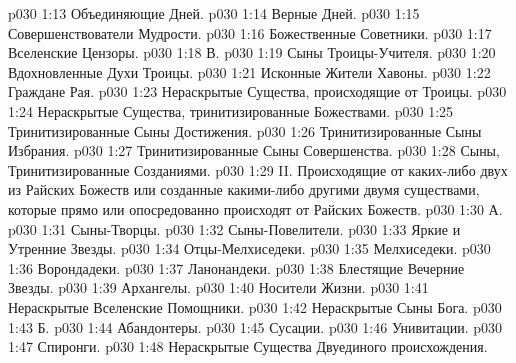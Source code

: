 \vs p030 1:13 \bibnobreakspace Объединяющие Дней.
\vs p030 1:14 \bibnobreakspace Верные Дней.
\vs p030 1:15 \bibnobreakspace Совершенствователи Мудрости.
\vs p030 1:16 \bibnobreakspace Божественные Советники.
\vs p030 1:17 \bibnobreakspace Вселенские Цензоры.
\vs p030 1:18 \pc В. 
\vs p030 1:19 \pc {}\bibnobreakspace Сыны Троицы\hyp{}Учителя.
\vs p030 1:20 \bibnobreakspace Вдохновленные Духи Троицы.
\vs p030 1:21 \bibnobreakspace Исконные Жители Хавоны.
\vs p030 1:22 \bibnobreakspace Граждане Рая.
\vs p030 1:23 \bibnobreakspace Нераскрытые Существа, происходящие от Троицы.
\vs p030 1:24 \bibnobreakspace Нераскрытые Существа, тринитизированные Божествами.
\vs p030 1:25 \bibnobreakspace Тринитизированные Сыны Достижения.
\vs p030 1:26 \bibnobreakspace Тринитизированные Сыны Избрания.
\vs p030 1:27 \bibnobreakspace Тринитизированные Сыны Совершенства.
\vs p030 1:28 \bibnobreakspace Сыны, Тринитизированные Созданиями.
\vs p030 1:29 \pc II.  Происходящие от каких\hyp{}либо двух из Райских Божеств или созданные какими\hyp{}либо другими двумя существами, которые прямо или опосредованно происходят от Райских Божеств.
\vs p030 1:30 \pc А. 
\vs p030 1:31 \bibnobreakspace Сыны\hyp{}Творцы.
\vs p030 1:32 \bibnobreakspace Сыны\hyp{}Повелители.
\vs p030 1:33 \bibnobreakspace Яркие и Утренние Звезды.
\vs p030 1:34 \bibnobreakspace Отцы\hyp{}Мелхиседеки.
\vs p030 1:35 \bibnobreakspace Мелхиседеки.
\vs p030 1:36 \bibnobreakspace Ворондадеки.
\vs p030 1:37 \bibnobreakspace Ланонандеки.
\vs p030 1:38 \bibnobreakspace Блестящие Вечерние Звезды.
\vs p030 1:39 \bibnobreakspace Архангелы.
\vs p030 1:40 \bibnobreakspace Носители Жизни.
\vs p030 1:41 \bibnobreakspace Нераскрытые Вселенские Помощники.
\vs p030 1:42 \bibnobreakspace Нераскрытые Сыны Бога.
\vs p030 1:43 \pc Б. 
\vs p030 1:44 \bibnobreakspace Абандонтеры.
\vs p030 1:45 \bibnobreakspace Сусации.
\vs p030 1:46 \bibnobreakspace Унивитации.
\vs p030 1:47 \bibnobreakspace Спиронги.
\vs p030 1:48 \bibnobreakspace Нераскрытые Существа Двуединого происхождения.
